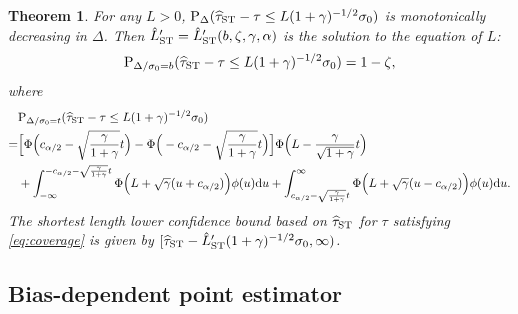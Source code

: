 \documentclass[11pt]{article}
\def\P{{\mathrm P}}
\def\d{{\mathrm d}}
\newcommand{\htau}{\widehat\tau}
\numberwithin{equation}{section}
\newtheorem{theorem}{Theorem}[section]
\theoremstyle{definition}
\begin{document}
\begin{theorem}\label{thm:oneside_ST}
  For any $L > 0$, $\P_\Delta(\htau_{\rm ST}- \tau \le L (1+\gamma)^{-1/2} \sigma_0)$ is monotonically decreasing in $\Delta$. Then $\hat{L}_{\rm ST}' = \hat{L}_{\rm ST}'(b, \zeta, \gamma, \alpha)$ is the solution to the equation of $L$:
  \begin{align*}
    \P_{\Delta/\sigma_0 = b}(\htau_{\rm ST}- \tau \le L (1+\gamma)^{-1/2} \sigma_0) = 1-\zeta,
  \end{align*} 
  where
  \begin{align*}
    &\P_{\Delta/\sigma_0 = t}(\htau_{\rm ST}- \tau \le L (1+\gamma)^{-1/2} \sigma_0) \\
    =& \Big[\Phi\Big(c_{\alpha/2} - \sqrt{\frac{\gamma}{1+\gamma}}t \Big) - \Phi\Big(-c_{\alpha/2} - \sqrt{\frac{\gamma}{1+\gamma}}t \Big)\Big]\Phi\Big(L - \frac{\gamma}{\sqrt{1+\gamma}}t \Big)\\
    &+ \int_{-\infty}^{-c_{\alpha/2} - \sqrt{\frac{\gamma}{1+\gamma}}t} \Phi\Big(L + \sqrt{\gamma} (u+c_{\alpha/2})\Big)\phi(u) \d u + \int_{c_{\alpha/2} - \sqrt{\frac{\gamma}{1+\gamma}}t}^\infty \Phi\Big(L + \sqrt{\gamma} (u-c_{\alpha/2})\Big)\phi(u) \d u.
  \end{align*}
  The shortest length lower confidence bound based on $\htau_{\rm ST}$ for $\tau$ satisfying \eqref{eq:coverage} is given by $[\htau_{\rm ST} - \hat{L}_{\rm ST}' (1+\gamma)^{-1/2} \sigma_0, \infty)$.
\end{theorem}


\subsection{Bias-dependent point estimator}\label{sec:bias_dependent}
\end{document}
